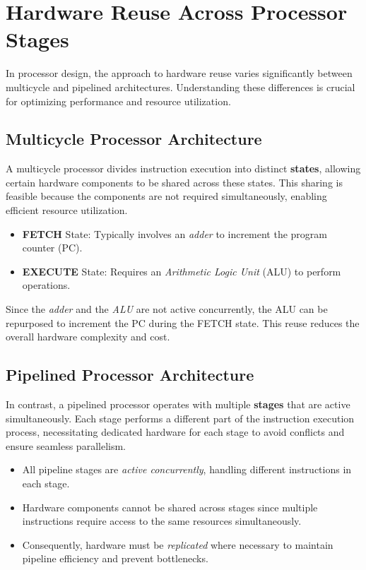 \section{Hardware Reuse Across Processor Stages}

In processor design, the approach to hardware reuse varies significantly between multicycle and pipelined architectures. Understanding these differences is crucial for optimizing performance and resource utilization.

\subsection{Multicycle Processor Architecture}

A multicycle processor divides instruction execution into distinct \textbf{states}, allowing certain hardware components to be shared across these states. This sharing is feasible because the components are not required simultaneously, enabling efficient resource utilization.

\begin{itemize}
    \item \textbf{FETCH} State: Typically involves an \textit{adder} to increment the program counter (PC).
    \item \textbf{EXECUTE} State: Requires an \textit{Arithmetic Logic Unit} (ALU) to perform operations.
\end{itemize}

Since the \textit{adder} and the \textit{ALU} are not active concurrently, the ALU can be repurposed to increment the PC during the FETCH state. This reuse reduces the overall hardware complexity and cost.

\subsection{Pipelined Processor Architecture}

In contrast, a pipelined processor operates with multiple \textbf{stages} that are active simultaneously. Each stage performs a different part of the instruction execution process, necessitating dedicated hardware for each stage to avoid conflicts and ensure seamless parallelism.

\begin{itemize}
    \item All pipeline stages are \textit{active concurrently}, handling different instructions in each stage.
    \item Hardware components cannot be shared across stages since multiple instructions require access to the same resources simultaneously.
    \item Consequently, hardware must be \textit{replicated} where necessary to maintain pipeline efficiency and prevent bottlenecks.
\end{itemize}


